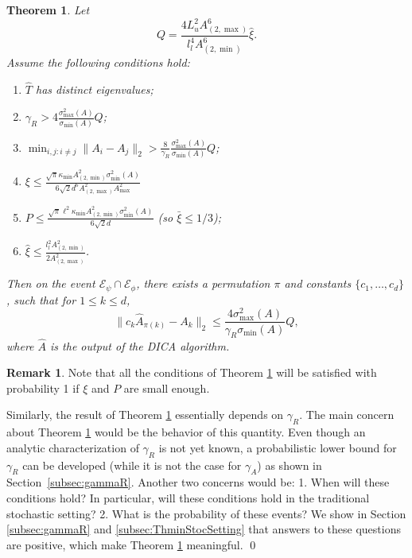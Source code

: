 \documentclass[twoside]{article}
\newcommand{\Epsi}{\mathcal{E}_{\psi}}
\newcommand{\Ephi}{\mathcal{E}_{\phi}}
\newtheorem{thm}[lemma]{Theorem}
\theoremstyle{definition}
\newtheorem{remark}[lemma]{Remark}
\begin{document}
\begin{thm}
\label{thm:Modefficiency}
Let 
 \[ 
 Q=  
 \frac{4L_u^2A^6_{(2,\max)}}{l_l^4 A^6_{(2,\min)}}\widehat{\xi}.
 \] 
 Assume the following conditions hold:
 \begin{enumerate}
 \vspace{-3mm}
 \item $\widehat{T}$ has distinct eigenvalues;
 \item $\gamma_R > 4 \frac{\sigma_{\max}^2(A)}{\sigma_{\min}(A) }Q$; 
 \item $\min_{i,j:i\neq j} \|A_i - A_j\|_2 > \frac{8}{\gamma_R}\frac{\sigma_{\max}^2(A)}{\sigma_{\min}(A) } Q$;
 \item $\xi \le \frac{\sqrt{\pi}\kappa_{\min}A^2_{(2,\min)}\sigma_{\min}^2(A)}{6\sqrt{2}d^6A_{(2,\max)}^2A_{\max}^2}$
 \item $P \le \frac{\sqrt{\pi}\ell^2\kappa_{\min}A^2_{(2,\min)}\sigma_{\min}^2(A)}{6\sqrt{2}d}$
 (so $\bar{\xi} \le 1/3$);
 \item $\widehat{\xi} \le \frac{l_l^2 A^2_{(2,\min)}}{2A^2_{(2,\max)}}$.
 \end{enumerate}
 \vspace{-2mm}
Then on the event $\Epsi \cap\Ephi$, there exists a permutation $\pi$ and constants $\{c_1,\ldots,c_d\}$, such that for $1\le k\le d$,
\[
\| c_k\widehat{A}_{\pi(k)} - A_k\|_2 \le \frac{4\sigma^2_{\max}(A)}{\gamma_R\sigma_{\min}(A)} Q,
\]
where $\widehat{A}$ is the output of the DICA algorithm.
\end{thm}
\begin{remark}
Note that all the conditions of Theorem \ref{thm:Modefficiency} will be satisfied with probability 1 if $\xi$ and $P$ are small enough.

Similarly, the result of Theorem \ref{thm:Modefficiency} essentially depends on $\gamma_R$. 
The main concern about Theorem \ref{thm:Modefficiency} would be the behavior of this quantity. 
Even though an analytic characterization of $\gamma_R$ is not yet known, a probabilistic lower bound for $\gamma_R$ can be developed (while it is not the case for $\gamma_A$) as shown in Section~\ref{subsec:gammaR}.
Another two concerns would be: 1. When will these conditions hold? In particular, will these conditions hold in the traditional stochastic setting? 2. What is the probability of these events?
We show in Section \ref{subsec:gammaR} and \ref{subsec:ThminStocSetting} that answers to these questions are positive, which make Theorem \ref{thm:Modefficiency} meaningful. \qed
\end{remark}
\end{document}
